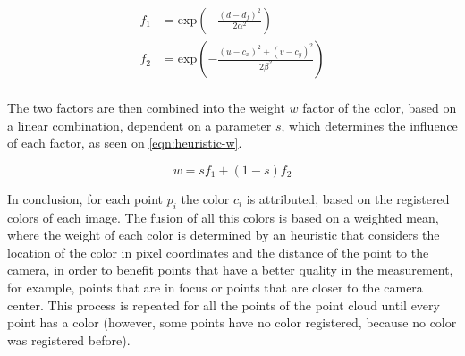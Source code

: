 \begin{align}
    \label{eqn:heuristic-f1}
    f_1 & = \mathrm{exp}\left(-\frac{(d-d_f)^2}{2\alpha^2}\right) \\
    \label{eqn:heuristic-f2}
    f_2 & = \mathrm{exp}\left(-\frac{(u-c_x)^2 + (v-c_y)^2}{2\beta^2}\right) \\
\end{align}

The two factors are then combined into the weight $w$ factor of the color, based on a linear combination, dependent on a parameter $s$, which determines the influence of each factor, as seen on \cref{eqn:heuristic-w}. 

\begin{equation}
    \label{eqn:heuristic-w}
    w = s f_1 + (1-s) f_2
\end{equation}

In conclusion, for each point $p_i$ the color $c_i$ is attributed, based on the registered colors of each image. The fusion of all this colors is based on a weighted mean, where the weight of each color is determined by an heuristic that considers the location of the color in pixel coordinates and the distance of the point to the camera, in order to benefit points that have a better quality in the measurement, for example, points that are in focus or points that are closer to the camera center. This process is repeated for all the points of the point cloud until every point has a color (however, some points have no color registered, because no color was registered before).